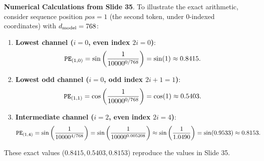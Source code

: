 \documentclass[../../main.tex]{subfiles}
\begin{document}
\noindent\textbf{Numerical Calculations from Slide 35}.\newline
To illustrate the exact arithmetic, consider sequence position $pos = 1$ (the second token, under 0-indexed coordinates) with $d_{\text{model}} = 768$:
\begin{enumerate}
    \item \textbf{Lowest channel ($i = 0$, even index $2i = 0$)}:
    \begin{equation}
    \text{\texttt{PE}}_{(1, 0)} = \sin\left(\frac{1}{10000^{0 / 768}}\right) = \sin(1) \approx 0.8415.
    \end{equation}
    \item \textbf{Lowest odd channel ($i = 0$, odd index $2i+1 = 1$)}:
    \begin{equation}
    \text{\texttt{PE}}_{(1, 1)} = \cos\left(\frac{1}{10000^{0 / 768}}\right) = \cos(1) \approx 0.5403.
    \end{equation}
    \item \textbf{Intermediate channel ($i = 2$, even index $2i = 4$)}:
    \begin{equation}
    \text{\texttt{PE}}_{(1, 4)} = \sin\left(\frac{1}{10000^{4 / 768}}\right) = \sin\left(\frac{1}{10000^{0.005208}}\right) \approx \sin\left(\frac{1}{1.0490}\right) = \sin(0.9533) \approx 0.8153.
    \end{equation}
\end{enumerate}
These exact values ($0.8415, 0.5403, 0.8153$) reproduce the values in Slide 35.
\end{document}
